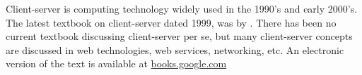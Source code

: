 \documentclass[a4paper,12pt]{article}
\begin{document}
Client-server is computing technology widely used in the 1990's and early 2000's. The latest textbook on client-server dated 1999, was by \cite{orfali2007css}. There has been no current textbook discussing client-server per se, but many  client-server concepts are discussed in web technologies, web services, networking, etc. An electronic version of the text is available at \url{books.google.com}



\end{document}
